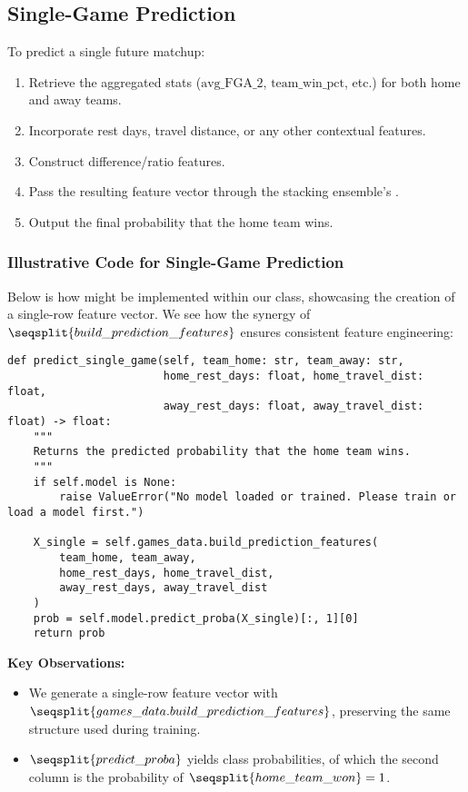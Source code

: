 \documentclass[12pt]{article}
\begin{document}
\subsection{Single-Game Prediction}
To predict a single future matchup:
\begin{enumerate}[label=\roman*)]
    \item Retrieve the aggregated stats (\(\text{avg\_FGA\_2}\), \(\text{team\_win\_pct}\), etc.) for both home and away teams.
    \item Incorporate rest days, travel distance, or any other contextual features.
    \item Construct difference/ratio features.
    \item Pass the resulting feature vector through the stacking ensemble’s .
    \item Output the final probability that the home team wins.
\end{enumerate}

\subsubsection{Illustrative Code for Single-Game Prediction}
Below is how  might be implemented within our  class, showcasing the creation of a single-row feature vector. We see how the synergy of \(\seqsplit{build\_prediction\_features}\) ensures consistent feature engineering:

\begin{verbatim}
def predict_single_game(self, team_home: str, team_away: str,
                        home_rest_days: float, home_travel_dist: float,
                        away_rest_days: float, away_travel_dist: float) -> float:
    """
    Returns the predicted probability that the home team wins.
    """
    if self.model is None:
        raise ValueError("No model loaded or trained. Please train or load a model first.")

    X_single = self.games_data.build_prediction_features(
        team_home, team_away,
        home_rest_days, home_travel_dist,
        away_rest_days, away_travel_dist
    )
    prob = self.model.predict_proba(X_single)[:, 1][0]
    return prob
\end{verbatim}

\noindent
\textbf{Key Observations:}
\begin{itemize}
    \item We generate a single-row feature vector with \(\seqsplit{games\_data.build\_prediction\_features}\), preserving the same structure used during training.
    \item \(\seqsplit{predict\_proba}\) yields class probabilities, of which the second column is the probability of \(\seqsplit{home\_team\_won} = 1\).
\end{itemize}
\end{document}
